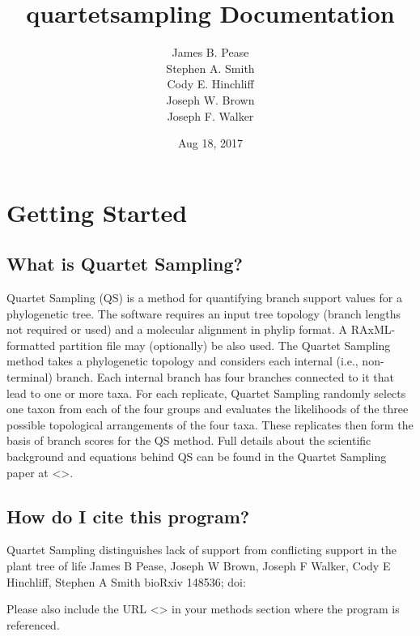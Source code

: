 \documentclass[letterpaper,12pt,english]{sphinxmanual}
\title{quartetsampling Documentation}
\date{Aug 18, 2017}
\author{James B. Pease \\ Stephen A. Smith \\ Cody E. Hinchliff \\Joseph W. Brown \\ Joseph F. Walker}
\begin{document}
\maketitle
\sphinxtableofcontents
{}\label{\detokenize{index::doc}}



\chapter{Getting Started}
\label{\detokenize{intro:getting-started}}\label{\detokenize{intro::doc}}\label{\detokenize{intro:manual-for-quartetsampling}}\label{\detokenize{intro:intro}}

\section{What is Quartet Sampling?}
\label{\detokenize{intro:what-is-quartet-sampling}}
Quartet Sampling (QS) is a method for quantifying branch support values for a phylogenetic tree.  The software requires an input tree topology (branch lengths not required or used) and a molecular alignment in phylip format.  A RAxML-formatted partition file may (optionally) be also used.  The Quartet Sampling method takes a phylogenetic topology and considers each internal (i.e., non-terminal) branch.  Each internal branch has four branches connected to it that lead to one or more taxa.  For each replicate, Quartet Sampling randomly selects one taxon from each of the four groups and evaluates the likelihoods of the three possible topological arrangements of the four taxa.  These replicates then form the basis of branch scores for the QS method.  Full details about the scientific background and equations behind QS can be found in the Quartet Sampling paper at \textless{}\textgreater{}.


\section{How do I cite this program?}
\label{\detokenize{intro:how-do-i-cite-this-program}}
Quartet Sampling distinguishes lack of support from conflicting support in the plant tree of life
James B Pease, Joseph W Brown, Joseph F Walker, Cody E Hinchliff, Stephen A Smith
bioRxiv 148536; doi: 

Please also include the URL \textless{}\textgreater{} in your methods section where the program is referenced.
\end{document}
